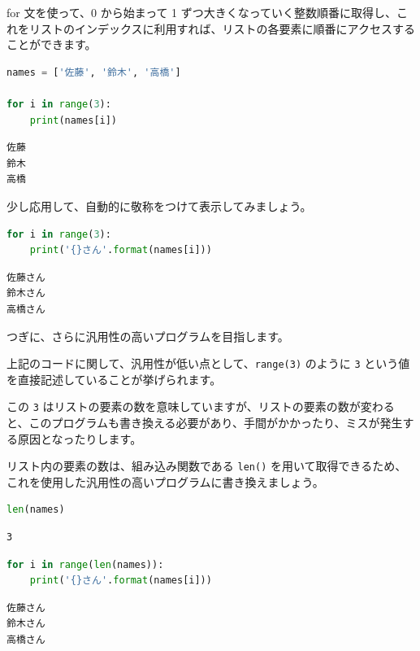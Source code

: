 for 文を使って、0 から始まって 1 ずつ大きくなっていく整数順番に取得し、これをリストのインデックスに利用すれば、リストの各要素に順番にアクセスすることができます。


\begin{lstlisting}[style=codecell,language=Python]
names = ['佐藤', '鈴木', '高橋']

for i in range(3):
    print(names[i])
\end{lstlisting}

\begin{lstlisting}[style=outputcell]
佐藤
鈴木
高橋
\end{lstlisting}

少し応用して、自動的に敬称をつけて表示してみましょう。


\begin{lstlisting}[style=codecell,language=Python]
for i in range(3):
    print('{}さん'.format(names[i]))
\end{lstlisting}

\begin{lstlisting}[style=outputcell]
佐藤さん
鈴木さん
高橋さん
\end{lstlisting}

つぎに、さらに汎用性の高いプログラムを目指します。


上記のコードに関して、汎用性が低い点として、\texttt{range(3)} のように \texttt{3} という値を直接記述していることが挙げられます。

この \texttt{3} はリストの要素の数を意味していますが、リストの要素の数が変わると、このプログラムも書き換える必要があり、手間がかかったり、ミスが発生する原因となったりします。


リスト内の要素の数は、組み込み関数である \texttt{len()} を用いて取得できるため、これを使用した汎用性の高いプログラムに書き換えましょう。


\begin{lstlisting}[style=codecell,language=Python]
len(names)
\end{lstlisting}

\begin{lstlisting}[style=outputcell]
3
\end{lstlisting}

\begin{lstlisting}[style=codecell,language=Python]
for i in range(len(names)):
    print('{}さん'.format(names[i]))
\end{lstlisting}

\begin{lstlisting}[style=outputcell]
佐藤さん
鈴木さん
高橋さん
\end{lstlisting}

